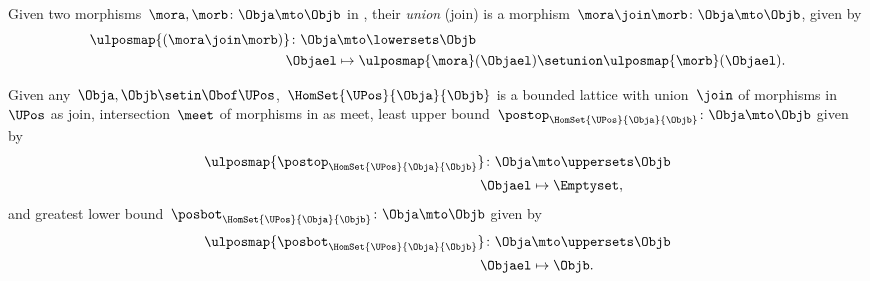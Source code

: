 \begin{definition}
    Given two morphisms~$\mora,\morb\colon \Obja \mto \Objb$ in \LPos, their \emph{union} (join) is a morphism~$\mora \join \morb \colon \Obja \mto \Objb$, given by
    \begin{equation}
        \begin{aligned}
            \ulposmap{(\mora \join \morb)}\colon \Obja & \mto \lowersets \Objb \\
            \Objael                                    & \mapsto \ulposmap{\mora}(\Objael) \setunion \ulposmap{\morb}(\Objael).
        \end{aligned}
    \end{equation}
\end{definition}

\begin{lemma}
    \label{lem:UPos-is-bounded-lattice}
    Given any~$\Obja,\Objb\setin \Obof\UPos$,~$\HomSet{\UPos}{\Obja}{\Objb}$ is a bounded lattice with union~$\join$ of morphisms in~$\UPos$ as join, intersection~$\meet$ of morphisms in \UPos as meet, least upper bound~$\postop_{\HomSet{\UPos}{\Obja}{\Objb}}\colon \Obja \mto \Objb$ given by
    \begin{equation}
        \begin{aligned}
            \ulposmap{\postop_{\HomSet{\UPos}{\Obja}{\Objb}}}\colon \Obja & \mto \uppersets \Objb \\
            \Objael                                                       & \mapsto \Emptyset,
        \end{aligned}
    \end{equation}
    and greatest lower bound~$\posbot_{\HomSet{\UPos}{\Obja}{\Objb}}\colon \Obja \mto \Objb$ given by
    \begin{equation}
        \begin{aligned}
            \ulposmap{\posbot_{\HomSet{\UPos}{\Obja}{\Objb}}}\colon \Obja & \mto \uppersets \Objb \\
            \Objael                                                       & \mapsto \Objb.
        \end{aligned}
    \end{equation}
\end{lemma}
